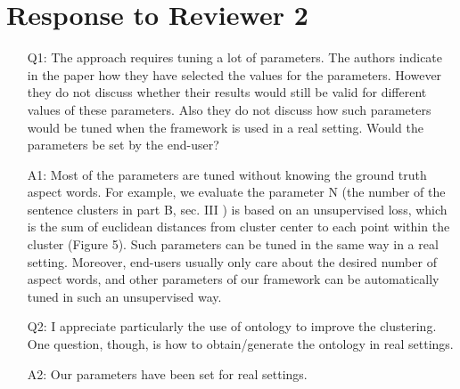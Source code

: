 \section{Response to Reviewer 2}
\begin{itemize}
	\item [Q1:] The approach requires tuning a lot of parameters. The authors indicate in the paper how they have selected the values for the parameters. However they do not discuss whether their results would still be valid for different values of these parameters. Also they do not discuss how such parameters would be tuned when the framework is used in a real setting. Would the parameters be set by the end-user?
	\item [A1:] 
	Most of the parameters are tuned without knowing the ground truth aspect words. For example, we evaluate the parameter N (the number of the sentence clusters in part B, sec. III ) is based on an unsupervised loss, which is the sum of euclidean distances from cluster center to each point within the cluster (Figure 5).  Such parameters can be tuned in the same way in a real setting. Moreover, end-users usually only care about the desired number of aspect words, 
and other parameters of our framework can be automatically tuned in such an 
unsupervised way.
	
	\item [Q2:] 
	I appreciate particularly the use of ontology to improve the clustering. One question, though, is how to obtain/generate the ontology in real settings.
	\item [A2:] 
	Our parameters have been set for real settings. 
	
	
\end{itemize}

